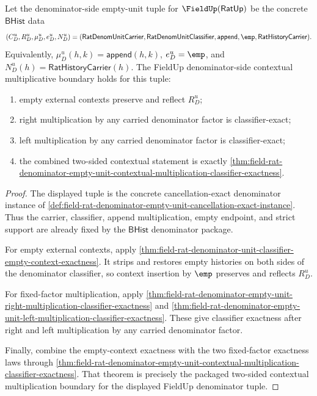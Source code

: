 \begin{theorem}
\label{thm:field-rat-denominator-fieldup-contextual-multiplicative-boundary}
Let the denominator-side empty-unit tuple for $\FieldUp(\mathsf{RatUp})$ be
the concrete $\mathsf{BHist}$ data
$$
(C_D^u,R_D^u,\mu_D^u,e_D^u,N_D^u)
=
(\mathsf{RatDenomUnitCarrier},\mathsf{RatDenomUnitClassifier},
\mathsf{append},\emp,\mathsf{RatHistoryCarrier}).
$$
Equivalently, $\mu_D^u(h,k)=\mathsf{append}(h,k)$,
$e_D^u=\emp$, and $N_D^u(h)=\mathsf{RatHistoryCarrier}(h)$. The
FieldUp denominator-side contextual multiplicative boundary holds for this
tuple:
\begin{enumerate}
  \item empty external contexts preserve and reflect $R_D^u$;
  \item right multiplication by any carried denominator factor is
  classifier-exact;
  \item left multiplication by any carried denominator factor is
  classifier-exact;
  \item the combined two-sided contextual statement is exactly
  \autoref{thm:field-rat-denominator-empty-unit-contextual-multiplication-classifier-exactness}.
\end{enumerate}
\end{theorem}
\begin{proof}
The displayed tuple is the concrete cancellation-exact denominator instance of
\autoref{def:field-rat-denominator-empty-unit-cancellation-exact-instance}.
Thus the carrier, classifier, append multiplication, empty endpoint, and strict
support are already fixed by the $\mathsf{BHist}$ denominator package.

For empty external contexts, apply
\autoref{thm:field-rat-denominator-unit-classifier-empty-context-exactness}.
It strips and restores empty histories on both sides of the denominator
classifier, so context insertion by $\emp$ preserves and reflects $R_D^u$.

For fixed-factor multiplication, apply
\autoref{thm:field-rat-denominator-empty-unit-right-multiplication-classifier-exactness}
and
\autoref{thm:field-rat-denominator-empty-unit-left-multiplication-classifier-exactness}.
These give classifier exactness after right and left multiplication by any
carried denominator factor.

Finally, combine the empty-context exactness with the two fixed-factor
exactness laws through
\autoref{thm:field-rat-denominator-empty-unit-contextual-multiplication-classifier-exactness}.
That theorem is precisely the packaged two-sided contextual multiplication
boundary for the displayed FieldUp denominator tuple.
\end{proof}

